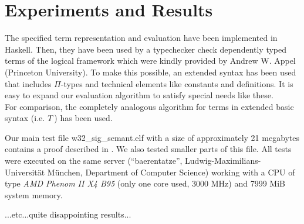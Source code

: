 \documentclass[submission,copyright,creativecommons]{eptcs}
\begin{document}
\section{Experiments and Results}

The specified term representation and evaluation have been implemented in Haskell. Then, they have been used by a typechecker check dependently typed terms of the logical framework which were kindly provided by Andrew W. Appel (Princeton University). To make this possible, an extended syntax has been used that includes $\Pi$-types and technical elements like constants and definitions. It is easy to expand our evaluation algorithm to satisfy special needs like these.
\\
For comparison, the completely analogous algorithm for terms in extended basic syntax (i.e. $T$) has been used.

Our main test file \textsf{w32\_sig\_semant.elf} with a size of approximately 21 megabytes contains a proof described in \cite{appel}. We also tested smaller parts of this file.
All tests were executed on the same server (``baerentatze'', Ludwig-Maximilians-Universit\"at M\"unchen, Department of Computer Science) working with a CPU of type \emph{AMD Phenom II X4 B95} (only one core used, 3000 MHz) and 7999 MiB system memory.

...etc...quite disappointing results...
\end{document}
